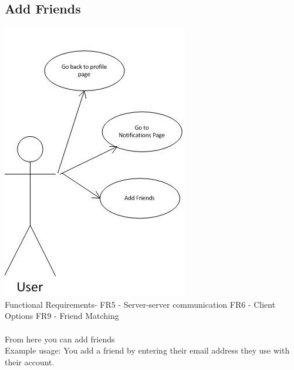 \documentclass{project}
\begin{document}
\subsection{Add Friends}
\includegraphics[scale=0.6]{AddFriendsPageUseCase.jpg}
\\
Functional Requirements-
FR5 - Server-server communication
FR6 - Client Options
FR9 - Friend Matching
\\
\\
From here you can add friends
\\
Example usage: You add a friend by entering their email address they use with
their account.

\newpage
\end{document}
